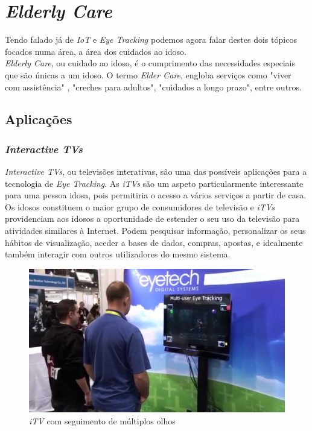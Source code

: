 \documentclass{llncs}
\begin{document}
\newpage


\section{\textit{Elderly Care}}
Tendo falado já de \textit{IoT} e \textit{Eye Tracking} podemos agora falar destes dois tópicos focados numa área, a área dos cuidados ao idoso. \\
\indent \textit{Elderly Care}, ou cuidado ao idoso, é o cumprimento das necessidades especiais que são únicas a um idoso. O termo \textit{Elder Care}, engloba serviços como "viver com assistência" , "creches para adultos", "cuidados a longo prazo", entre outros. \cite{ar1} \\

\subsection{Aplicações}
\subsubsection{\textit{Interactive TVs}}
\textit{Interactive TVs}, ou televisões interativas, são uma das possíveis aplicações para a tecnologia de \textit{Eye Tracking}. As \textit{iTVs} são um aspeto particularmente interessante para uma pessoa idosa, pois permitiria o acesso a vários serviços a partir de casa. \cite{ar2} \\
\indent Os idosos constituem o maior grupo de consumidores de televisão e \textit{iTVs} providenciam aos idosos a oportunidade de estender o seu uso da televisão para atividades similares à Internet. Podem pesquisar informação, personalizar os seus hábitos de visualização, aceder a bases de dados, compras, apostas, e idealmente também interagir com outros utilizadores do mesmo sistema. \cite{ar2} \\

\begin{figure}[!ht]
\centering
\includegraphics[width=120mm]{itv.jpg}
\caption{\textit{iTV} com seguimento de múltiplos olhos}
\end{figure}
\end{document}
